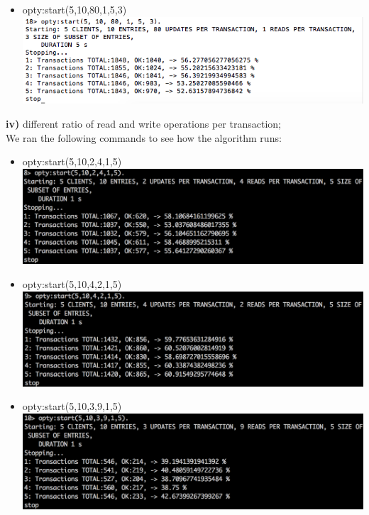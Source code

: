 \documentclass[a4paper, 11pt]{article}
\begin{document}
\begin{itemize}
\item opty:start(5,10,80,1,5,3)\\
\includegraphics[scale=0.5]{images/exp-iii-6.png} \\
\end{itemize}
%
\newpage
\textbf{iv)} different ratio of read and write operations per transaction;\\
We ran the following commands to see how the algorithm runs:\\
\begin{itemize}
\item opty:start(5,10,2,4,1,5)\\
\includegraphics[scale=0.5]{images/exp-iv-1.png} \\
\item opty:start(5,10,4,2,1,5)\\
\includegraphics[scale=0.5]{images/exp-iv-2.png} \\
\item opty:start(5,10,3,9,1,5)\\
\includegraphics[scale=0.5]{images/exp-iv-3.png} \\

\end{itemize}
\end{document}
